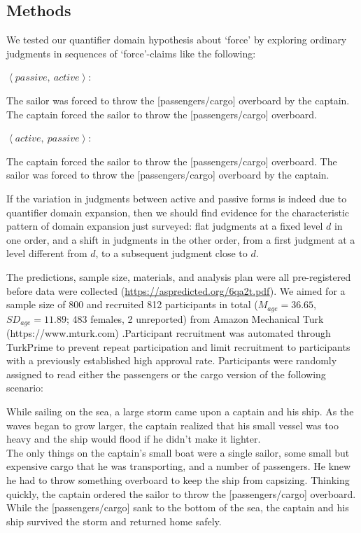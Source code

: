 \documentclass{salt}
\newcommand{\seq}[1]{\left\langle {#1} \right\rangle}
\begin{document}
\subsection{Methods}

We tested our quantifier domain hypothesis about `force' by exploring ordinary judgments in sequences of `force'-claims like the following: 

\begin{exe}\ex \label{sail-capt} $\seq{passive,~ active}$: \begin{xlist}\ex The sailor was forced to throw the [passengers/cargo] overboard by the captain. \ex The captain forced the sailor to throw the [passengers/cargo] overboard. \end{xlist}\end{exe}

\begin{exe}\ex \label{capt-sail} $\seq{active,~ passive}$: \begin{xlist}\ex The captain forced the sailor to throw the [passengers/cargo] overboard. \ex The sailor was forced to throw the [passengers/cargo] overboard by the captain. \end{xlist}\end{exe}

\noindent If the variation in judgments between active and passive forms is indeed due to quantifier domain expansion, then we should find evidence for the characteristic pattern of domain expansion just surveyed: flat judgments at a fixed level $d$ in one order, and a shift in judgments in the other order, from a first judgment at a  level different from $d$, to a subsequent judgment close to $d$.

The predictions, sample size, materials, and analysis plan were all pre-registered before data were	 collected (\url{https://aspredicted.org/6qa2t.pdf}). We aimed for a sample size of 800 and recruited 812 participants in total ($M_{age}=36.65$, $SD_{age}=11.89$; 483 females, 2 unreported) from Amazon Mechanical Turk (https://www.mturk.com) \citep{buhrmester2011amazon}.Participant recruitment was automated through TurkPrime to prevent repeat participation and limit recruitment to participants with a previously established high approval rate. Participants were randomly assigned to read either the passengers or the cargo version of the following scenario: 

\begin{exe}\ex While sailing on the sea, a large storm came upon a captain and his ship. As the waves began to grow larger, the captain realized that his small vessel was too heavy and the ship would flood if he didn't make it lighter. \\ \hspace*{.5cm}The only things on the captain's small boat were a single sailor, some small but expensive cargo that he was transporting, and a number of passengers. He knew he had to throw something overboard to keep the ship from capsizing. Thinking quickly, the captain ordered the sailor to throw the [passengers/cargo] overboard. While the [passengers/cargo] sank to the bottom of the sea, the captain and his ship survived the storm and returned home safely.\end{exe}
\end{document}

